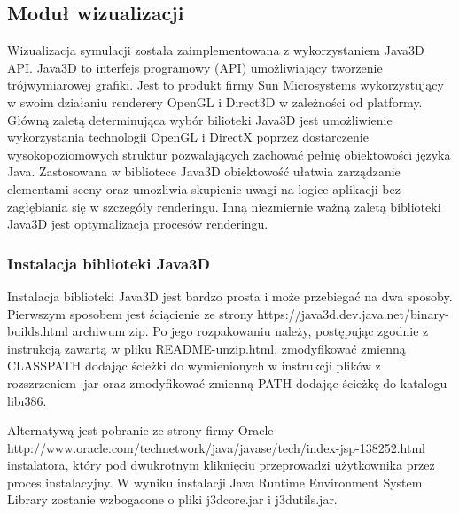 \subsection {Moduł wizualizacji}
Wizualizacja symulacji została zaimplementowana z wykorzystaniem Java3D API.
Java3D to interfejs programowy (API) umożliwiający tworzenie trójwymiarowej grafiki. Jest to produkt firmy Sun Microsystems wykorzystujący w swoim działaniu renderery OpenGL i Direct3D w zależności od platformy.
Główną zaletą determinująca wybór bilioteki Java3D jest umożliwienie wykorzystania technologii OpenGL i DirectX poprzez dostarczenie wysokopoziomowych struktur pozwalających zachować pełnię obiektowości języka Java. 
Zastosowana w bibliotece Java3D obiektowość ułatwia zarządzanie elementami sceny oraz umożliwia skupienie uwagi na logice aplikacji bez zagłębiania się w szczegóły renderingu. Inną niezmiernie ważną zaletą biblioteki Java3D jest optymalizacja procesów renderingu.
\subsubsection{Instalacja biblioteki Java3D}
Instalacja biblioteki Java3D jest bardzo prosta i może przebiegać na dwa sposoby.
Pierwszym sposobem jest ściącienie ze strony https://java3d.dev.java.net/binary-builds.html archiwum zip. Po jego rozpakowaniu należy, postępując zgodnie z instrukcją zawartą w pliku README-unzip.html, zmodyfikować zmienną CLASSPATH dodając ścieżki do wymienionych w instrukcji plików z rozszrzeniem .jar oraz zmodyfikować zmienną PATH dodając ścieżkę do katalogu lib\i386.


Alternatywą jest pobranie ze strony firmy Oracle http://www.oracle.com/technetwork/java/javase/tech/index-jsp-138252.html
instalatora, który pod dwukrotnym kliknięciu przeprowadzi użytkownika przez proces instalacyjny. 
W wyniku instalacji Java Runtime Environment System Library zostanie wzbogacone o pliki j3dcore.jar i j3dutils.jar.
